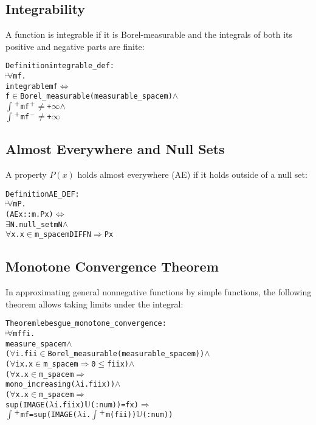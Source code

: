 \subsection{Integrability}

A function is integrable if it is Borel-measurable and the integrals of both its positive and negative parts are finite:
\begin{hol}
\begin{alltt}
Definition integrable\_def :
\(\!\!\!{\turn}\!\!\!\!\) \(\forall\)m f.
integrable m f \({\Leftrightarrow}\)
f \(\in\) Borel\_measurable (measurable\_space m) \(\land\)
\(\int\)\(\sp{+}\) m f\(\sp{+}\) \(\ne\) +\(\infty\) \(\land\)
\(\int\)\(\sp{+}\) m f\(\sp{-}\) \(\ne\) +\(\infty\)
\end{alltt}
\end{hol}

\subsection{Almost Everywhere and Null Sets}

A property $P(x)$ holds almost everywhere (AE) if it holds outside of a null set:
\begin{hol}
\begin{alltt}
Definition AE\_DEF :
\(\!\!\!{\turn}\!\!\!\!\) \(\forall\)m P.
(AE x::m. P x) \({\Leftrightarrow}\)
\(\exists\)N. null\_set m N \(\land\)
\(\forall\)x. x \(\in\) m\_space m DIFF N \(\Rightarrow\) P x
\end{alltt}
\end{hol}

\subsection{Monotone Convergence Theorem}

In approximating general nonnegative functions by simple functions, the following theorem allows taking limits under the integral:
\begin{hol}
\begin{alltt}
Theorem lebesgue\_monotone\_convergence :
\(\!\!\!{\turn}\!\!\!\!\) \(\forall\)m f fi.
measure\_space m \(\land\)
(\(\forall\)i. fi i \(\in\) Borel\_measurable (measurable\_space m)) \(\land\)
(\(\forall\)i x. x \(\in\) m\_space m \(\Rightarrow\) 0 \(\le\) fi i x) \(\land\)
(\(\forall\)x. x \(\in\) m\_space m \(\Rightarrow\)
   mono\_increasing (\(\lambda\)i. fi i x)) \(\land\)
(\(\forall\)x. x \(\in\) m\_space m \(\Rightarrow\)
   sup (IMAGE (\(\lambda\)i. fi i x) \(\mathbb{U}\)(:num)) = f x) \(\Rightarrow\)
\(\int\)\(\sp{+}\) m f = sup (IMAGE (\(\lambda\)i. \(\int\)\(\sp{+}\) m (fi i)) \(\mathbb{U}\)(:num))
\end{alltt}
\end{hol}

